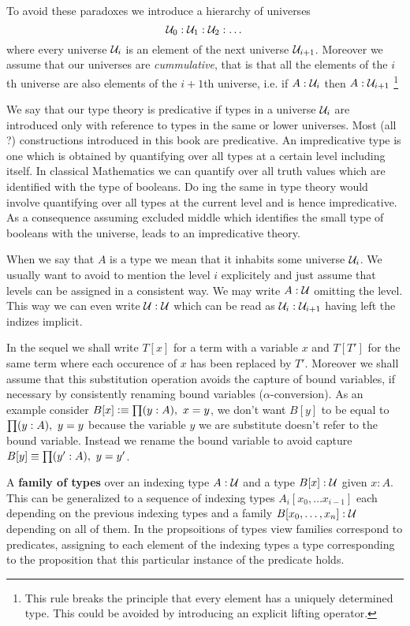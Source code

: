 To avoid these paradoxes we introduce a hierarchy of universes
\[ \mathcal{U}_0 : \mathcal{U}_1 : \mathcal{U}_2 : \dots \]
where every universe $\mathcal{U}_i$ is an element of the next universe
$\mathcal{U}_{i+1}$. Moreover we assume that our universes are
\emph{cummulative}, that is that all the elements of the $i$th
universe are also elements of the $i+1$th universe, i.e. if
$A:\mathcal{U}_i$ then $A:\mathcal{U}_{i+1}$
\footnote{This rule breaks the principle that every element
  has a uniquely determined type. This could be avoided by introducing
  an explicit lifting operator.}

We say that our type theory is predicative if types in a universe
$\mathcal{U}_i$ are introduced only with reference to types in the same or
lower universes. Most (all ?) constructions introduced in this book
are predicative. An impredicative type is one which is obtained by
quantifying over all types at a certain level including itself. In
classical Mathematics we can quantify over all truth values which are
identified with the type of booleans. Do ing the same in type theory
would involve quantifying over all types at the current level and is
hence impredicative. As a consequence assuming excluded middle which
identifies the small type of booleans with the universe, leads to an
impredicative theory.

When we say that $A$ is a type we mean that it inhabits some universe
$\mathcal{U}_i$. We usually want to avoid to mention the level $i$ explicitely
and just assume that levels can be assigned in a consistent way. We
may write $A:\mathcal{U}$ omitting the level. This way we can even write
$\mathcal{U}:\mathcal{U}$ which can be read as $\mathcal{U}_i:\mathcal{U}_{i+1}$ having left the
indizes implicit. 

In the sequel we shall write $T[x]$ for a term with a variable $x$ and
$T[T']$ for the same term where each occurence of $x$ has been
replaced by $T'$. Moreover we shall assume that this substitution
operation avoids the capture of bound variables, if necessary by
consistently renaming bound variables ($\alpha$-conversion).
As an example consider $B[x] \defeq \prd{y:A}x = y$, we don't want
$B[y]$ to be equal to $\prd{y:A}y = y$ because the variable $y$ we are
substitute doesn't refer to the bound variable. Instead we rename the
bound variable to avoid capture $B[y] \jdeq \prd{y':A}y = y'$.

A \textbf{family of types} over an indexing type $A:\mathcal{U}$ and a 
type $B[x] : \mathcal{U}$ given $x:A$. This can be generalized to a sequence of indexing
types $A_i[x_0,\dots x_{i-1}]$ each depending on the previous indexing
types and a family $B[x_0,\dots,x_n] : \mathcal{U}$ depending on all of them. In the
propsoitions of types view families correspond to predicates,
assigning to each element of the indexing types a type corresponding
to the proposition that this particular instance of the predicate holds.

